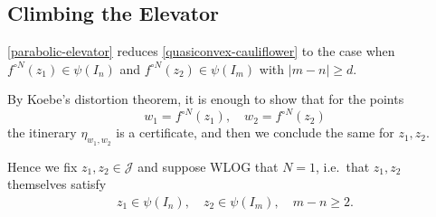 \begin{comment}
\begin{proof}
Let
\begin{align*}
\CriticalOrbit(f)=\{f^n(0): n \in \mathbb N\}
\end{align*} be the forward orbit of the critical point.
As long as the distance $|z_1-z_2|$ is small in comparison to the distances of $z_1,z_2$ from $\CriticalOrbit(f)$, we profit from applying $f$: By standard distortion estimates, 
\begin{align*}
|f(z_1)-f(z_2)|\geq c |z_1-z_2|
\end{align*}
for some constant $c>1$.

Indeed, in this case there is an annulus of definite modulus that has both $z_1,z_2$ in its bounded complementary component and has all points of $\CriticalOrbit(f)$ in the unbounded complementary component.

Instead of keeping track of the distance to $\mathrm{CriticalOrbit}(f)$, it is enough to consider the distance to the fixed point $1/2$, which is its only accumulation point on $\mathcal J$.

Thus by repeatedly applying $f$ we either manage to separate $z_1,z_2$ a definite distance apart, in which case the argument for the hyperbolic case works, or we manage to make (WLOG) 
\begin{align*}
\big|f^{\circ m} (z_1)-\tfrac 12\big| \leq c |f^{\circ m} (z_1)-f^{\circ m} (z_2)|
\end{align*}
for a constant $c$.
\end{proof}
\end{comment}

\subsection{Climbing the Elevator}
\cref{parabolic-elevator} reduces \cref{quasiconvex-cauliflower} to the case when $f^{\circ N }(z_1) \in \psi(I_n)$ and $f^{\circ N}(z_2) \in \psi(I_m)$ with $|m-n| \geq d$.

By Koebe's distortion theorem, it is enough to show that for the points $$w_1=f^{\circ N }(z_1),\quad w_2=f^{\circ N }(z_2)$$ the itinerary $\eta_{w_1,w_2}$ is a certificate, and then we conclude the same for $z_1,z_2$. 

Hence we fix $z_1,z_2 \in \mathcal J$ and suppose WLOG that $N=1$, i.e.\ that $z_1,z_2$ themselves satisfy 
\begin{align} \label{parabolic separation}
	z_1 \in \psi(I_n), \quad z_2 \in \psi(I_m), \quad m-n \geq 2.
\end{align}


